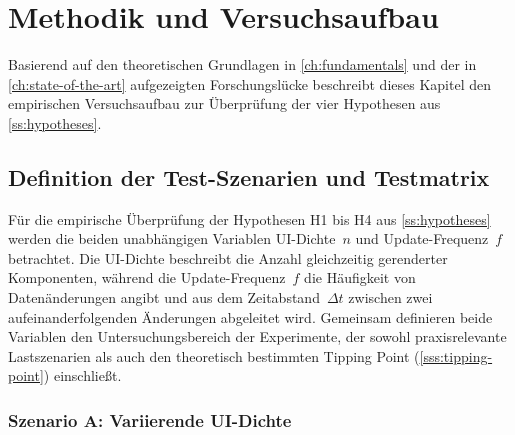 \chapter{Methodik und Versuchsaufbau}
\label{ch:methodology}

Basierend auf den theoretischen Grundlagen in \cref{ch:fundamentals} und der in \cref{ch:state-of-the-art} aufgezeigten Forschungslücke beschreibt dieses Kapitel den empirischen Versuchsaufbau zur Überprüfung der vier Hypothesen aus \cref{ss:hypotheses}.

\section{Definition der Test-Szenarien und Testmatrix}
\label{s:test-scenarios}

Für die empirische Überprüfung der Hypothesen H1 bis H4 aus \cref{ss:hypotheses} werden die beiden unabhängigen Variablen UI-Dichte~$n$ und Update-Frequenz~$f$ betrachtet. Die UI-Dichte beschreibt die Anzahl gleichzeitig gerenderter Komponenten, während die Update-Frequenz~$f$ die Häufigkeit von Datenänderungen angibt und aus dem Zeitabstand~$\Delta t$ zwischen zwei aufeinanderfolgenden Änderungen abgeleitet wird. Gemeinsam definieren beide Variablen den Untersuchungsbereich der Experimente, der sowohl praxisrelevante Lastszenarien als auch den theoretisch bestimmten Tipping Point (\cref{sss:tipping-point}) einschließt.

\subsection{Szenario A: Variierende UI-Dichte}
\label{ss:scenario-a}

